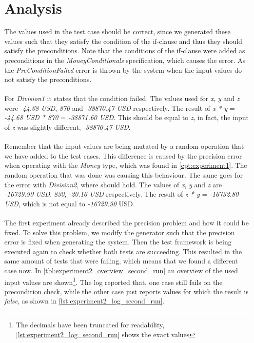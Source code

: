 \section{Analysis}
The values used in the test case should be correct, since we generated these values such that they satisfy the condition of the if-clause and thus they should satisfy the preconditions. Note that the conditions of the if-clause were added as preconditions in the \textit{MoneyConditionals} specification, which causes the error. As the \textit{PreConditionFailed} error is thrown by the system when the input values do not satisfy the preconditions.\\
\\
For \textit{Division1} it states that the condition  failed. The
values used for \textit{x}, \textit{y} and \textit{z} were \textit{-44.68 USD},
\textit{870} and \textit{-38870.47 USD} respectively. The result of
\textit{x * y} = \textit{-44.68 USD * 870} = \textit{-38871.60 USD}. This should
be equal to \textit{z}, in fact, the input of \textit{z} was slightly different,
\textit{-38870.47 USD}.\\
\\
Remember that the input values are being mutated by a
random operation that we have added to the test cases. This difference is caused
by the precision error when operating with the \textit{Money} type, which was
found in \autoref{cpt:experiment1}. The random operation that was done was
causing this behaviour. The same goes for the error with \textit{Division2},
where  should hold. The values of \textit{x}, \textit{y} and
\textit{z} are \textit{-16729.90 USD}, \textit{830}, \textit{-20.16 USD}
respectively. The result of \textit{z * y} = \textit{-16732.80 USD}, which is
not equal to \textit{-16729.90} USD.\\
\\
The first experiment already described the precision problem and how it could be fixed. To solve this problem, we modify the generator such that the precision error is fixed when generating the system. Then the test framework is being executed again to check whether both tests are succeeding. This resulted in the same amount of tests that were failing, which means that we found a different case now. In \autoref{tbl:experiment2_overview_second_run} an overview of the used input values are shown\footnote{The decimals have been truncated for readability, \autoref{lst:experiment2_log_second_run} shows the exact values}. The log reported that, one case still fails on the precondition check, while the other case just reports values for which the result is \textit{false}, as shown in \autoref{lst:experiment2_log_second_run}.
